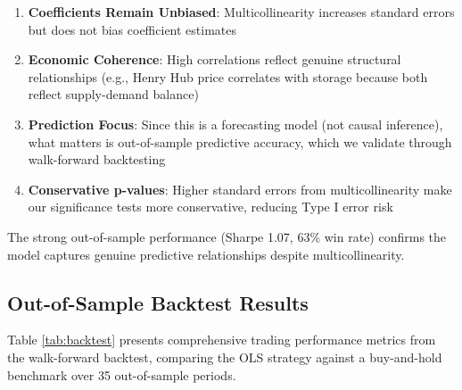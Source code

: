 \documentclass[12pt,a4paper]{article}
\begin{document}
\begin{enumerate}
    \item \textbf{Coefficients Remain Unbiased}: Multicollinearity increases standard errors but does not bias coefficient estimates

    \item \textbf{Economic Coherence}: High correlations reflect genuine structural relationships (e.g., Henry Hub price correlates with storage because both reflect supply-demand balance)

    \item \textbf{Prediction Focus}: Since this is a forecasting model (not causal inference), what matters is out-of-sample predictive accuracy, which we validate through walk-forward backtesting

    \item \textbf{Conservative p-values}: Higher standard errors from multicollinearity make our significance tests more conservative, reducing Type I error risk
\end{enumerate}

The strong out-of-sample performance (Sharpe 1.07, 63\% win rate) confirms the model captures genuine predictive relationships despite multicollinearity.

\subsection{Out-of-Sample Backtest Results}

Table \ref{tab:backtest} presents comprehensive trading performance metrics from the walk-forward backtest, comparing the OLS strategy against a buy-and-hold benchmark over 35 out-of-sample periods.
\end{document}
